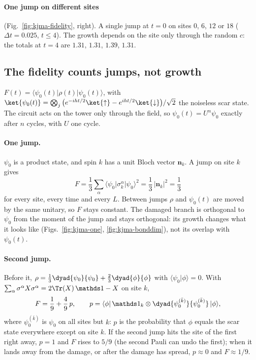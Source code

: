 \paragraph{One jump on different sites} (Fig.~\ref{fig:kjma-fidelity}, right). A single jump at $t = 0$ on sites $0$, $6$, $12$ or $18$ ($\Delta t = 0.025$, $t \le 4$). The growth depends on the site only through the random $c$: the totals at $t = 4$ are $1.31$, $1.31$, $1.39$, $1.31$.

\subsection{The fidelity counts jumps, not growth}
\label{sec:kjma-fidelity}

$F(t) = \langle\psi_0(t)\vert\rho(t)\vert\psi_0(t)\rangle$, with $\ket{\psi_0(t)} = \bigotimes_j \big(e^{-iht/2}\ket{\uparrow} - e^{iht/2}\ket{\downarrow}\big)/\sqrt2$ the noiseless scar state. The circuit acts on the tower only through the field, so $\psi_0(t) = U^n\psi_0$ exactly after $n$ cycles, with $U$ one cycle.

\paragraph{One jump.} $\psi_0$ is a product state, and spin $k$ has a unit Bloch vector $\boldsymbol n_k$. A jump on site $k$ gives
\begin{equation}
F = \frac13\sum_{\alpha}\langle\psi_0\vert\sigma^\alpha_k\vert\psi_0\rangle^2 = \frac13\,\lvert\boldsymbol n_k\rvert^2 = \frac13
\end{equation}
for every site, every time and every $L$. Between jumps $\rho$ and $\psi_0(t)$ are moved by the same unitary, so $F$ stays constant. The damaged branch is orthogonal to $\psi_0$ from the moment of the jump and stays orthogonal: its growth changes what it looks like (Figs.~\ref{fig:kjma-one}, \ref{fig:kjma-bonddim}), not its overlap with $\psi_0(t)$.

\paragraph{Second jump.} Before it, $\rho = \tfrac13\dyad{\psi_0}{\psi_0} + \tfrac23\dyad{\phi}{\phi}$ with $\langle\psi_0\vert\phi\rangle = 0$. With $\sum_\alpha\sigma^\alpha X\sigma^\alpha = 2\Tr(X)\,\mathds 1 - X$ on site $k$,
\begin{equation}
F = \frac19 + \frac49\,p, \qquad p = \langle\phi\vert\,\mathds 1_k \otimes \dyad{\psi_0^{(\bar k)}}{\psi_0^{(\bar k)}}\,\vert\phi\rangle ,
\label{eq:kjma-F2}
\end{equation}
where $\psi_0^{(\bar k)}$ is $\psi_0$ on all sites but $k$: $p$ is the probability that $\phi$ equals the scar state everywhere except on site $k$. If the second jump hits the site of the first right away, $p = 1$ and $F$ rises to $5/9$ (the second Pauli can undo the first); when it lands away from the damage, or after the damage has spread, $p \approx 0$ and $F \approx 1/9$.

